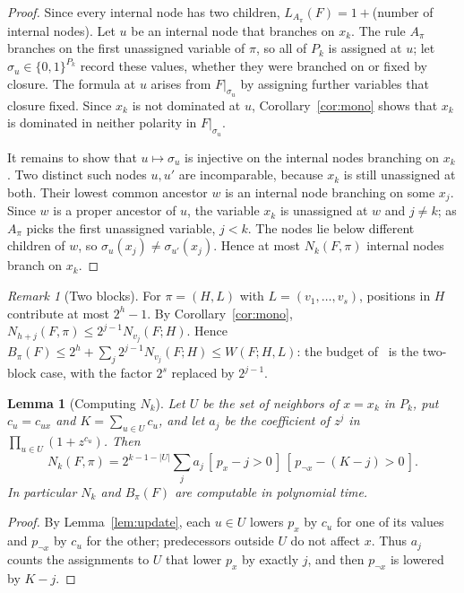 \documentclass[11pt,a4paper]{article}
\newtheorem{lemma}[theorem]{Lemma}
\theoremstyle{remark}
\newtheorem{remark}[theorem]{Remark}
\begin{document}
\begin{proof}
Since every internal node has two children,
$L_{A_\pi}(F)=1+{}$(number of internal nodes). Let $u$ be an internal node
that branches on $x_k$. The rule $A_\pi$ branches on the first unassigned
variable of $\pi$, so all of $P_k$ is assigned at $u$; let
$\sigma_u\in\{0,1\}^{P_k}$ record these values, whether they were branched on
or fixed by closure. The formula at $u$ arises from $F|_{\sigma_u}$ by
assigning further variables that closure fixed. Since $x_k$ is not dominated
at $u$, Corollary~\ref{cor:mono} shows that $x_k$ is dominated in neither
polarity in $F|_{\sigma_u}$.

It remains to show that $u\mapsto\sigma_u$ is injective on the internal nodes
branching on $x_k$. Two distinct such nodes $u,u'$ are incomparable, because
$x_k$ is still unassigned at both. Their lowest common ancestor $w$ is an
internal node branching on some $x_j$. Since $w$ is a proper ancestor of $u$,
the variable $x_k$ is unassigned at $w$ and $j\ne k$; as $A_\pi$ picks the
first unassigned variable, $j<k$. The nodes lie below different children of
$w$, so $\sigma_u(x_j)\ne\sigma_{u'}(x_j)$. Hence at most $N_k(F,\pi)$
internal nodes branch on $x_k$.
\end{proof}

\begin{remark}[Two blocks]\label{rem:twoblock}
For $\pi=(H,L)$ with $L=(v_1,\dots,v_s)$, positions in $H$ contribute at most
$2^h-1$. By Corollary~\ref{cor:mono}, $N_{h+j}(F,\pi)\le2^{j-1}N_{v_j}(F;H)$.
Hence $B_\pi(F)\le2^h+\sum_j2^{j-1}N_{v_j}(F;H)\le W(F;H,L)$: the budget
of~\cite[Sec.~7]{N2} is the two-block case, with the factor $2^s$ replaced by
$2^{j-1}$.
\end{remark}

\begin{lemma}[Computing $N_k$]\label{lem:compute}
Let $U$ be the set of neighbors of $x=x_k$ in $P_k$, put $c_u=c_{ux}$ and
$K=\sum_{u\in U}c_u$, and let $a_j$ be the coefficient of $z^j$ in
$\prod_{u\in U}(1+z^{c_u})$. Then
\[
 N_k(F,\pi)=2^{k-1-|U|}\sum_{j}a_j\,[\,p_x-j>0\,]\,[\,p_{\neg x}-(K-j)>0\,].
\]
In particular $N_k$ and $B_\pi(F)$ are computable in polynomial time.
\end{lemma}

\begin{proof}
By Lemma~\ref{lem:update}, each $u\in U$ lowers $p_x$ by $c_u$ for one of its
values and $p_{\neg x}$ by $c_u$ for the other; predecessors outside $U$ do
not affect $x$. Thus $a_j$ counts the assignments to $U$ that lower $p_x$ by
exactly $j$, and then $p_{\neg x}$ is lowered by $K-j$.
\end{proof}
\end{document}
